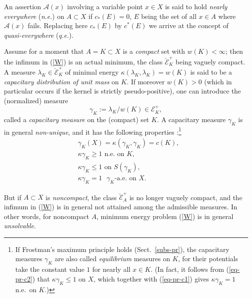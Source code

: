 \documentclass[12pt,a4paper,reqno]{amsart} %
\theoremstyle{lause}
\theoremstyle{maaritelma}
\theoremstyle{lause}
\theoremstyle{maaritelma}
\numberwithin{equation}{section}
\begin{document}
An assertion $\mathcal A(x)$ involving a variable point $x\in X$ is said to hold {\it nearly everywhere\/} ({\it n.e.\/}) on $A\subset X$ if $c_*(E)=0$, $E$ being the set of all $x\in A$ where $\mathcal A(x)$ fails. Replacing here $c_*(E)$ by $c^*(E)$ we arrive at the concept of {\it qua\-si-ev\-ery\-whe\-re\/} ({\it q.e.\/}).

Assume for a moment that $A=K\subset X$ is a {\it compact\/} set with $w(K)<\infty$; then the infimum in (\ref{W}) is an actual minimum, the class $\breve{\mathcal E}^+_K$ being vaguely compact. A measure $\lambda_K\in\breve{\mathcal E}^+_K$ of minimal energy $\kappa(\lambda_K,\lambda_K)=w(K)$ is said to be a {\it capacitary distribution of unit mass\/} on $K$. If moreover $w(K)>0$ (which in particular occurs if the kernel is strictly pse\-udo-pos\-it\-ive), one can introduce the (normalized) measure
\[\gamma_K:=\lambda_K/w(K)\in\mathcal E^+_K,\]
called a {\it capacitary measure\/}
on the (compact) set $K$. A capacitary measure $\gamma_K$ is in general {\it non-unique}, and it
has the following properties \cite[Theorem~2.4]{F1}:\footnote{If Frostman's maximum principle holds (Sect.~\ref{subs-pr}), the capacitary measures $\gamma_K$ are also called {\it equilibrium\/} measures on $K$, for their potentials take the constant value $1$ for nearly all $x\in K$. (In fact, it follows from (\ref{eq-pr-c2}) that $\kappa\gamma_K\leqslant1$ on $X$, which together with (\ref{eq-pr-c1}) gives $\kappa\gamma_K=1$ n.e.\ on $K$.)\label{fr}}
\begin{align}
\label{eq-pr-c0}&\gamma_K(X)=\kappa(\gamma_K,\gamma_K)=c(K),\\
\label{eq-pr-c1}&\kappa\gamma_K\geqslant1\text{ \ n.e.\ on\ }K,\\
\label{eq-pr-c2}&\kappa\gamma_K\leqslant1\text{ \ on\ }S(\gamma_K),\\
\label{eq-pr-c3}&\kappa\gamma_K=1\text{ \ $\gamma_K$-a.e.\ on $X$.}
\end{align}

But if $A\subset X$ is {\it noncompact}, the class $\breve{\mathcal E}^+_A$ is no longer vaguely compact, and the infimum in (\ref{W}) is in general not attained among the admissible measures. In other words, for noncompact $A$, minimum energy problem (\ref{W}) is in general {\it unsolvable}.
\end{document}
